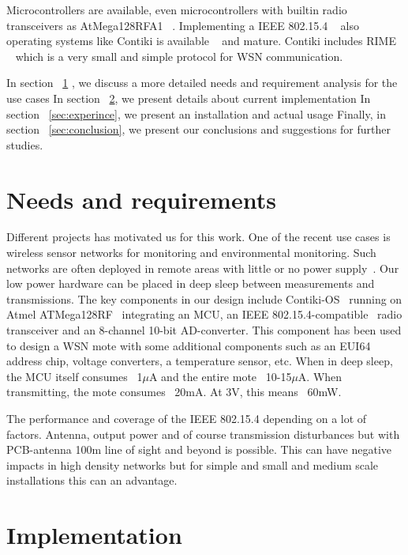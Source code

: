 \documentclass[conference, a4paper,10pt,twocolumn]{IEEEtran}
\begin{document}
Microcontrollers are available, even microcontrollers with builtin radio transceivers 
as AtMega128RFA1 ~\cite{ATMEGA}. Implementing a IEEE 802.15.4 ~\cite{802154} also operating 
systems like Contiki is available ~\cite{CONTIKI} and mature. Contiki includes RIME ~\cite{CONTIKI} 
which is a very small and simple protocol for WSN communication.


In section ~\ref{sec:needs} , we discuss a more detailed needs and requirement analysis for the use cases
In section ~\ref{sec:implementation}, we present details about current implementation  
In section ~\ref{sec:experince}, we present an installation and actual usage
Finally, in section ~\ref{sec:conclusion}, we present our conclusions and suggestions for further studies.
 
\section{Needs and requirements}
\label{sec:needs}


Different projects has motivated us for this work. One of the recent use cases is wireless sensor 
networks for monitoring and environmental monitoring.
Such networks are often deployed in remote areas with little or no power supply~\cite{UBIQUI}.  
Our low power hardware can be placed in deep sleep between measurements and transmissions.  The key 
components in our design include  Contiki-OS~\cite{CONTIKI} running on Atmel ATMega128RF~\cite{ATMEGA} 
integrating an MCU, an IEEE 802.15.4-compatible~\cite{802154} radio transceiver and an 8-channel 10-bit 
AD-converter. This component has been used to design a WSN mote with some additional components such 
as an EUI64 address chip, voltage converters, a temperature sensor, etc. When in deep sleep, the MCU 
itself consumes ~1$\mu$A and the entire mote ~10-15$\mu$A. When transmitting, the mote consumes 
~20mA. At 3V, this means ~60mW. 

The performance and coverage of the IEEE 802.15.4 depending on a lot of factors. Antenna, output
power and of course transmission disturbances but with PCB-antenna 100m line of sight and beyond 
is possible. This can have negative impacts in high density networks but for simple and small and
medium scale installations this can an advantage.


\section{Implementation}
\label{sec:implementation}
\end{document}
